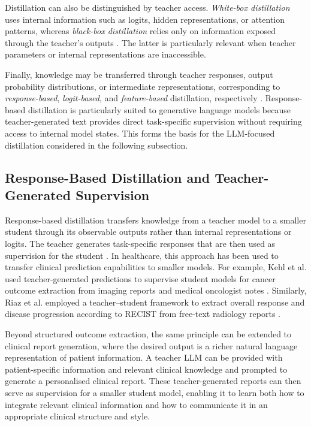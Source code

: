 \documentclass[ %
                    author={Aman Kumar Singh},
                supervisor={Dr. Edwin Simpson},
                    degree={MSc},
                     title={Quality-Aware Knowledge Distillation of Large Language Models for Efficient Personalised Clinical Report Generation},
                  subtitle={},
                      type={},
                      year={2021}]{dissertation}
\begin{document}
Distillation can also be distinguished by teacher access.
\textit{White-box distillation} uses internal information such as logits,
hidden representations, or attention patterns, whereas
\textit{black-box distillation} relies only on information exposed through
the teacher's outputs \cite{donisch_inference_2024,shi_knowledge_2025}.
The latter is particularly relevant when teacher parameters or internal
representations are inaccessible.

Finally, knowledge may be transferred through teacher responses, output
probability distributions, or intermediate representations, corresponding
to \textit{response-based}, \textit{logit-based}, and
\textit{feature-based} distillation, respectively
\cite{yang_categories_2023,habib_knowledge_2024,park_relational_2019}.
Response-based distillation is particularly suited to generative language
models because teacher-generated text provides direct task-specific
supervision without requiring access to internal model states. This forms
the basis for the LLM-focused distillation considered in the following
subsection.
\subsection{Response-Based Distillation and Teacher-Generated Supervision}
\label{sec:response_based_distillation_llms}
Response-based distillation transfers knowledge from a teacher model to a
smaller student through its observable outputs rather than internal
representations or logits. The teacher generates task-specific responses that
are then used as supervision for the student \cite{wang_knowledge_2026}. In healthcare, this approach has
been used to transfer clinical prediction capabilities to smaller models. For
example, Kehl et al. used teacher-generated predictions to supervise student
models for cancer outcome extraction from imaging reports and medical
oncologist notes \cite{kehl_shareable_2024}. Similarly, Riaz et al. employed a
teacher--student framework to extract overall response and disease progression
according to RECIST from free-text radiology reports
\cite{riaz_empirical_2025}.

Beyond structured outcome extraction, the same principle can be extended to
clinical report generation, where the desired output is a richer natural
language representation of patient information. A teacher LLM can be provided
with patient-specific information and relevant clinical knowledge and prompted
to generate a personalised clinical report. These teacher-generated reports
can then serve as supervision for a smaller student model, enabling it to learn
both how to integrate relevant clinical information and how to communicate it
in an appropriate clinical structure and style.
\end{document}
